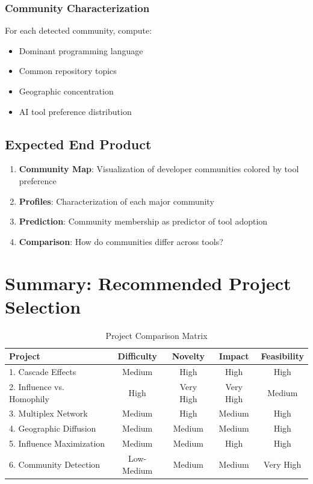 \documentclass[11pt,letterpaper]{article}
\begin{document}
\subsubsection{Community Characterization}

For each detected community, compute:
\begin{itemize}
    \item Dominant programming language
    \item Common repository topics
    \item Geographic concentration
    \item AI tool preference distribution
\end{itemize}

\subsection{Expected End Product}

\begin{enumerate}
    \item \textbf{Community Map}: Visualization of developer communities colored by tool preference
    \item \textbf{Profiles}: Characterization of each major community
    \item \textbf{Prediction}: Community membership as predictor of tool adoption
    \item \textbf{Comparison}: How do communities differ across tools?
\end{enumerate}

\section{Summary: Recommended Project Selection}

\begin{table}[h]
\centering
\caption{Project Comparison Matrix}
\label{tab:comparison}
\begin{tabular}{lcccc}
\toprule
\textbf{Project} & \textbf{Difficulty} & \textbf{Novelty} & \textbf{Impact} & \textbf{Feasibility} \\
\midrule
1. Cascade Effects & Medium & High & High & High \\
2. Influence vs. Homophily & High & Very High & Very High & Medium \\
3. Multiplex Network & Medium & High & Medium & High \\
4. Geographic Diffusion & Medium & Medium & Medium & High \\
5. Influence Maximization & Medium & Medium & High & High \\
6. Community Detection & Low-Medium & Medium & Medium & Very High \\
\bottomrule
\end{tabular}
\end{table}
\end{document}
